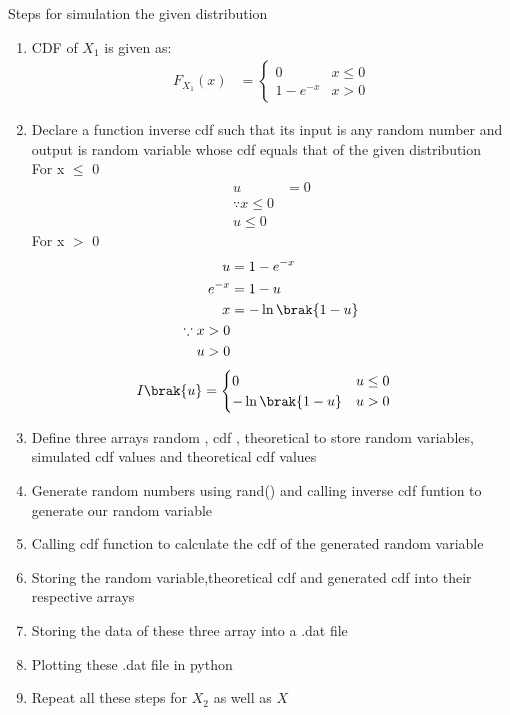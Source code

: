 \documentclass[journal,12pt,twocolumn]{IEEEtran}
\theoremstyle{remark}
\begin{document}
Steps for simulation the given distribution 
\begin{enumerate}
\item CDF of $X_1$ is given as:
  \begin{align}
  F_{X_1}(x) &= 
  \begin{cases}
	  0 & x \le 0
  \\
	  1- e^{-x} &  x > 0
  \end{cases}
  \end{align}
\item Declare a function inverse cdf  such that its input is any random number 
	and output is random variable whose cdf equals that of the given distribution\\
	For x $\le$ 0
		\begin{align}
			u &= 0 \\
			\because x \le 0\\
			u \le 0
		\end{align}
	For x $>$ 0
		\begin{align}
			u &= 1- e^{-x}\\
			e^{-x} &= 1-u\\
			x &= -\ln \brak{1-u}\\
			\because x > 0\\
			u > 0
		\end{align}
  \begin{align}
  I\brak{u} &=
  \begin{cases}
	  0 & u \le 0
  \\
	  -\ln \brak{1-u} &  u > 0
  \end{cases}
  \end{align}
\item Define three arrays random , cdf
	, theoretical
	to store random variables, simulated cdf values and theoretical cdf values
\item Generate random numbers using rand() and calling inverse cdf funtion to generate our random variable
\item Calling cdf function to calculate the cdf of the generated random variable
\item Storing the random variable,theoretical cdf and generated cdf into their respective arrays
\item Storing the data of these three array into a .dat file
\item Plotting these .dat file in python
\item Repeat all these steps for $X_2$ as well as $X$
\end{enumerate}
\end{document}
